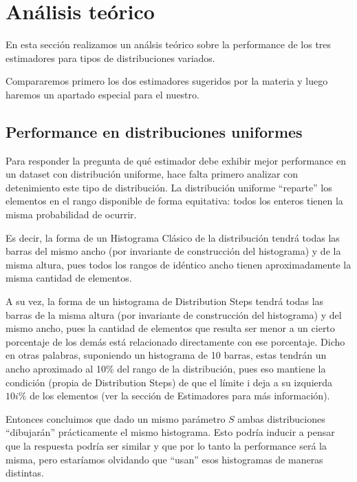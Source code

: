 \section{Análisis teórico}
En esta sección realizamos un análsis teórico sobre la performance de los tres estimadores para tipos de distribuciones variados.

Compararemos primero los dos estimadores sugeridos por la materia y luego haremos un apartado especial para el nuestro.

\subsection{Performance en distribuciones uniformes}
Para responder la pregunta de qué estimador debe exhibir mejor performance en un dataset con distribución uniforme, hace falta primero analizar con detenimiento este tipo de distribución. La distribución uniforme ``reparte'' los elementos en el rango disponible de forma equitativa: todos los enteros tienen la misma probabilidad de ocurrir.

Es decir, la forma de un Histograma Clásico de la distribución tendrá todas las barras del mismo ancho (por invariante de construcción del histograma) y de la misma altura, pues todos los rangos de idéntico ancho tienen aproximadamente la misma cantidad de elementos.

A su vez, la forma de un histograma de Distribution Steps tendrá todas las barras de la misma altura (por invariante de construcción del histograma) y del mismo ancho, pues la cantidad de elementos que resulta ser menor a un cierto porcentaje de los demás está relacionado directamente con ese porcentaje. Dicho en otras palabras, suponiendo un histograma de 10 barras, estas tendrán un ancho aproximado al 10\% del rango de la distribución, pues eso mantiene la condición (propia de Distribution Steps) de que el límite i deja a su izquierda $10i\%$ de los elementos (ver la sección de Estimadores para más información).

Entonces concluimos que dado un mismo parámetro $S$ ambas distribuciones ``dibujarán'' prácticamente el mismo histograma. Esto podría inducir a pensar que la respuesta podría ser similar y que por lo tanto la performance será la misma, pero estaríamos olvidando que ``usan'' esos histogramas de maneras distintas.


